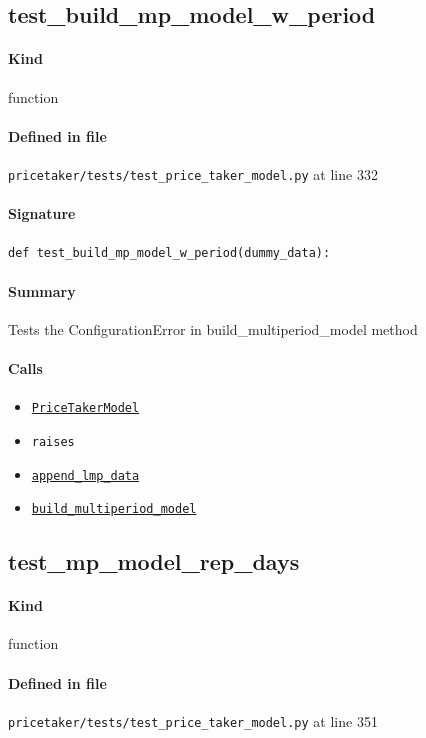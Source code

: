\documentclass[11pt]{report}
\begin{document}
\subsection{test\_build\_mp\_model\_w\_period}
\label{def:pricetaker-tests-test_price_taker_model.py:test_build_mp_model_w_period:L332}
\paragraph{Kind} function
\paragraph{Defined in file} \texttt{pricetaker/tests/test\_price\_taker\_model.py} at line 332
\paragraph{Signature} \texttt{def test\_build\_mp\_model\_w\_period(dummy\_data):}
\paragraph{Summary} Tests the ConfigurationError in build\_multiperiod\_model method
\paragraph{Calls}
\begin{itemize}[leftmargin=*]
  \item \hyperref[def:pricetaker-price_taker_model.py:PriceTakerModel:L161]{\texttt{PriceTakerModel}}
  \item \texttt{raises}
  \item \hyperref[def:pricetaker-price_taker_model.py:PriceTakerModel.append_lmp_data:L221]{\texttt{append\_lmp\_data}}
  \item \hyperref[def:pricetaker-price_taker_model.py:PriceTakerModel.build_multiperiod_model:L291]{\texttt{build\_multiperiod\_model}}
\end{itemize}
\subsection{test\_mp\_model\_rep\_days}
\label{def:pricetaker-tests-test_price_taker_model.py:test_mp_model_rep_days:L351}
\paragraph{Kind} function
\paragraph{Defined in file} \texttt{pricetaker/tests/test\_price\_taker\_model.py} at line 351
\end{document}
